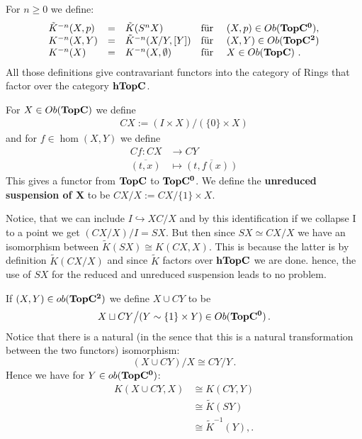 \begin{definition}
	For $n\geq 0$ we define:
	\begin{align*}
		\begin{array}{lclll}
			\Tilde{K}^{-n}(X,p)&= &\Tilde{K}(S^nX)& \text{für } &(X,p)\in Ob(\operatorname{\mathbf{TopC^0}}),\\
			K^{-n}(X,Y)&= &\Tilde{K}^{-n}(X\slash Y,[Y]) &\text{für } &(X,Y)\in Ob(\operatorname{\mathbf{TopC^2}})\\
			K^{-n}(X) &= &K^{-n}(X,\emptyset) &\text{für } &X\in Ob(\operatorname{\mathbf{TopC}})~.
		\end{array}
	\end{align*}
	All those definitions give contravariant functors into the category of Rings that factor over the category $\operatorname{\mathbf{hTopC}}$.
\end{definition}
\begin{definition}\label{def: Cone on X}
	For $X\in Ob(\operatorname{\mathbf{TopC}})$ we define
	\begin{align*}
		CX:=(I\times X) \big/(\{0\}\times X)
	\end{align*} and for $f\in \hom(X,Y)$ we define 
	\begin{align*}
		Cf:CX &\to CY\\
		\overline{(t,x)}&\mapsto \overline{(t,f(x))}
	\end{align*} This gives a functor from $\operatorname{\mathbf{TopC}}$ to $\operatorname{\mathbf{TopC^0}}$.
	We define the \textbf{unreduced suspension of X} to be $CX\slash X := CX\slash \{1\}\times X$.
\end{definition}
\begin{cor}
	Notice, that we can include $I\hookrightarrow XC\slash X $ and by this identification if we collapse I to a point we get $(CX\slash X)\big/ I =SX$. But then since $SX\simeq CX\slash X$ we have an isomorphism between $\tilde{K}(SX)\cong K(CX,X)$. This is because the latter is by definition $\tilde{K}(CX\slash X)$ and since $\tilde{K}$ factors over $\operatorname{\mathbf{hTopC}}$ we are done. hence, the use of $SX$ for the reduced and unreduced suspension leads to no problem.
\end{cor}
\begin{cor}\label{cor: first iso to reduction of K-group}
	If $(X,Y)\in ob(\operatorname{\mathbf{TopC^2}})$ we define $X\cup CY$ to be $$X\sqcup CY\big/(Y\sim \{1\}\times Y)\in Ob(\operatorname{\mathbf{TopC^0}})\, .$$ Notice that there is a natural (in the sence that this is a natural transformation between the two functors) isomorphism:
	\begin{equation}
		(X\cup CY) \big/ X \cong CY\slash Y\, .
	\end{equation}Hence we have for $Y\in ob(\operatorname{\mathbf{TopC^0}})$:
	\begin{align*}
		K(X\cup CY,X)&\cong K(CY,Y)\\
		&\cong \tilde{K}(SY)\\
		&\cong \tilde{K}^{-1}(Y),.
	\end{align*}
\end{cor}
